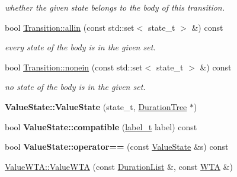 \begin{DoxyCompactItemize}
\begin{DoxyCompactList}\small\item\em whether the given state belongs to the body of this transition. \end{DoxyCompactList}\item 
\mbox{\label{group__schemata_ga9719bf4a7c1e1ec8e0e1fceed8da0a11}} 
bool \mbox{\hyperlink{group__schemata_ga9719bf4a7c1e1ec8e0e1fceed8da0a11}{Transition\+::allin}} (const std\+::set$<$ state\+\_\+t $>$ \&) const
\begin{DoxyCompactList}\small\item\em every state of the body is in the given set. \end{DoxyCompactList}\item 
\mbox{\label{group__schemata_ga6bb49bac8dc5d5dbfb955b9eaea29276}} 
bool \mbox{\hyperlink{group__schemata_ga6bb49bac8dc5d5dbfb955b9eaea29276}{Transition\+::nonein}} (const std\+::set$<$ state\+\_\+t $>$ \&) const
\begin{DoxyCompactList}\small\item\em no state of the body is in the given set. \end{DoxyCompactList}\item 
\mbox{\label{group__schemata_ga78ce9830cde7d7875888ab5b420beecf}} 
{\bfseries Value\+State\+::\+Value\+State} (state\+\_\+t, \mbox{\hyperlink{classDurationTree}{Duration\+Tree}} $\ast$)
\item 
\mbox{\label{group__schemata_gaa64b0072478e5475befdb4b0212d8e2e}} 
bool {\bfseries Value\+State\+::compatible} (\mbox{\hyperlink{group__output_ga22fde970e635fcf63962743b2d5c441d}{label\+\_\+t}} label) const
\item 
\mbox{\label{group__schemata_ga8e4a967143877229169d6c28842185c8}} 
bool {\bfseries Value\+State\+::operator==} (const \mbox{\hyperlink{classValueState}{Value\+State}} \&s) const
\item 
\mbox{\label{group__schemata_gab35a1ee1d6e2b2b5d82b930b4d70340f}} 
\mbox{\hyperlink{group__schemata_gab35a1ee1d6e2b2b5d82b930b4d70340f}{Value\+W\+T\+A\+::\+Value\+W\+TA}} (const \mbox{\hyperlink{classDurationList}{Duration\+List}} \&, const \mbox{\hyperlink{classWTA}{W\+TA}} \&)

\end{DoxyCompactItemize}

